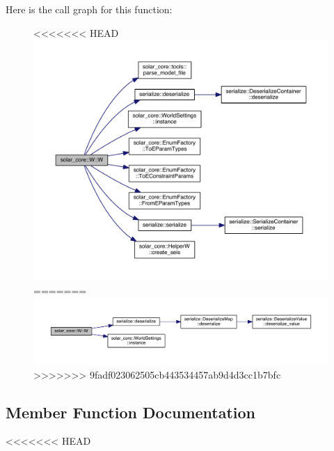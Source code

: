 Here is the call graph for this function\+:
\nopagebreak
\begin{figure}[H]
\begin{center}
\leavevmode
<<<<<<< HEAD
\includegraphics[width=350pt]{classsolar__core_1_1_w_a969ad4de57020878a91873868c9bdb45_cgraph}
=======
\includegraphics[width=350pt]{classsolar__core_1_1_w_aa252edac9babf33b41e22a816648a9a5_cgraph}
>>>>>>> 9fadf023062505cb443534457ab9d4d3cc1b7bfc
\end{center}
\end{figure}




\subsection{Member Function Documentation}
<<<<<<< HEAD
\hypertarget{classsolar__core_1_1_w_a0b92657c681579dacc29821f41650541}{}
